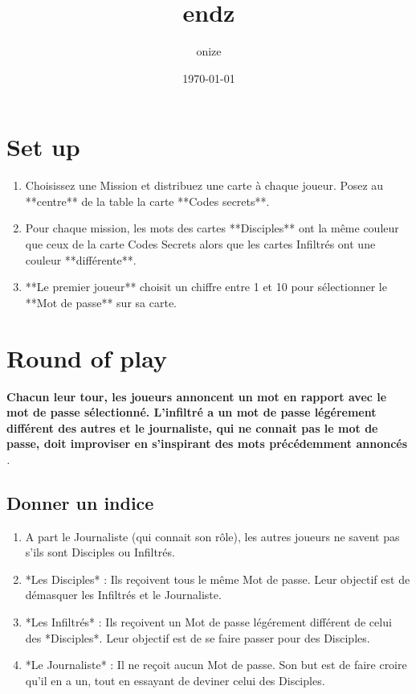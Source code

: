 \documentclass{article}%
\title{endz}%
\author{onize}%
\date{\today}%
\begin{document}
%
\pagestyle{empty}%
\normalsize%
\maketitle%
\section{ Set up
}%
\label{sec:Setup}%
\begin{enumerate}%
\item%
 Choisissez une Mission et distribuez une carte à chaque joueur. Posez au **centre** de la table la carte **Codes secrets**.
%
\item%
 Pour chaque mission, les mots des cartes **Disciples** ont la même couleur que ceux de la carte Codes Secrets alors que les cartes Infiltrés ont une couleur **différente**.
%
\item%
 **Le premier joueur** choisit un chiffre entre 1 et 10 pour sélectionner le **Mot de passe** sur sa carte.
%
\end{enumerate}

%
\section{ Round of play
}%
\label{sec:Roundofplay}%
\textbf{Chacun leur tour, les joueurs annoncent un mot en rapport avec le mot de passe sélectionné. L'infiltré a un mot de passe légérement différent des autres et le journaliste, qui ne connait pas le mot de passe, doit improviser en s'inspirant des mots précédemment annoncés}%
\textit{.
}

%
\subsection{ Donner un indice
}%
\label{subsec:Donnerunindice}%
\begin{enumerate}%
\item%
 A part le Journaliste (qui connait son rôle), les autres joueurs ne savent pas s'ils sont Disciples ou Infiltrés.
%
\item%
 *Les Disciples* : Ils reçoivent tous le même Mot de passe. Leur objectif est de démasquer les Infiltrés et le Journaliste.
%
\item%
 *Les Infiltrés* : Ils reçoivent un Mot de passe légérement différent de celui des *Disciples*. Leur objectif est de se faire passer pour des Disciples.
%
\item%
 *Le Journaliste* : Il ne reçoit aucun Mot de passe. Son but est de faire croire qu'il en a un, tout en essayant de deviner celui des Disciples.
%
\end{enumerate}
\end{document}
